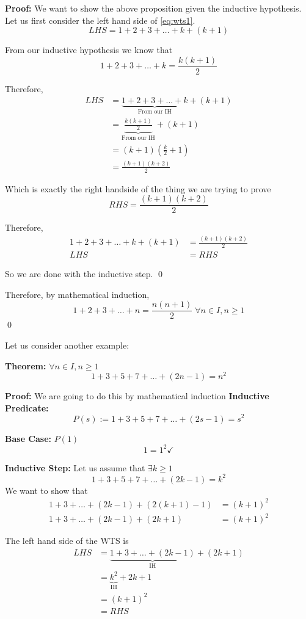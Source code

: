 \documentclass[a4paper, 12pt]{article}
\newcommand{\theorem}{\noindent\textbf{Theorem:} }
\newcommand{\predicate}{\noindent\textbf{Inductive Predicate:} }
\newcommand{\inductivestep}{\noindent\textbf{Inductive Step:} }
\renewcommand{\proof}{\noindent\textbf{Proof:} }
\newcommand{\basecase}{\noindent\textbf{Base Case:} }
\newcommand{\qedd}{\qed\newline}
\theoremstyle{examplestyle}
\begin{document}
\begin{multicols}{2}
\proof We want to show the above proposition given the inductive hypothesis. Let us first consider the left hand side of \ref{eq:wts1}.
\[
	LHS = 1 + 2 + 3 + \ldots + k + (k+1)	
\]

From our inductive hypothesis we know that
\[
	1 + 2 + 3 + \ldots + k = \frac{k(k+1)}{2}	
\]

Therefore,
\begin{align*}
	LHS &= \underbrace{1 + 2 + 3 + \ldots + k}_{\text{From our IH}} + (k+1)\\
	& = \underbrace{\frac{k(k+1)}{2}}_{{\text{From our IH}}} + (k+1) \\
	& = (k+1)\left(\frac{k}{2}+1\right)\\
	& = \frac{(k+1)(k+2)}{2}
\end{align*}

Which is exactly the right handside of the thing we are trying to prove
\[
RHS = \frac{(k+1)(k+2)}{2}
\]

Therefore,
\begin{align*}
1 + 2 + 3 + \ldots + k + (k+1) &= \frac{(k+1)(k+2)}{2}\\
LHS &= RHS
\end{align*}

So we are done with the inductive step. \qed

Therefore, by mathematical induction,
\[
1+2+3+ \ldots + n = \frac{n(n+1)}{2} \; \forall n \in I, n\ge1
\]
\qedd

Let us consider another example:

\theorem$\forall n \in I, n \ge 1$
\[
1+3+5+7+\ldots+(2n-1) = n^2 
\]

\proof We are going to do this by mathematical induction
\newline
\predicate
\[
P(s) := 1+3+5+7+\ldots+(2s-1) = s^2
\]

\basecase $P(1)$
\[
1 = 1^2 \checkmark
\]

\inductivestep Let us assume that $\exists k \ge 1$
\[
1+3+5+7+\ldots+(2k-1) = k^2 
\]
We want to show that
\begin{align*}
1+3+\ldots+(2k-1) + (2(k+1) -1 ) &= (k+1)^2  \\
1+3+\ldots+(2k-1) + (2k + 1) &= (k+1)^2 
\end{align*}

The left hand side of the WTS is
\begin{align*}
LHS &= \underbrace{1+3+\ldots+(2k-1)}_{\text{IH}} + (2k + 1)\\
&= \underbrace{k^2}_{\text{IH}} + 2k + 1\\
&= (k+1)^2\\
&= RHS
\end{align*}


\end{multicols}
\end{document}
